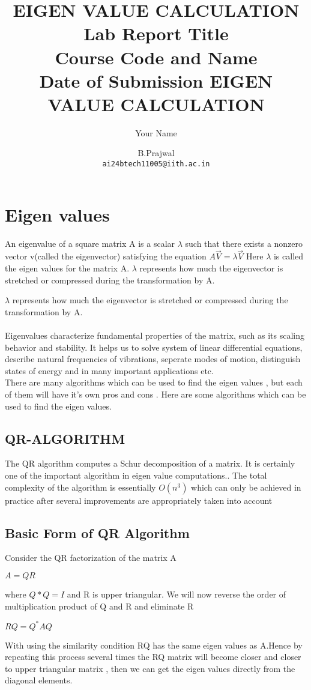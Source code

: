 \documentclass[a4paper,12pt]{article}
\title{ EIGEN VALUE CALCULATION
    \vspace{2cm} %
    \vspace{1cm} %
    \textbf{\Huge Lab Report Title} \\
    \vspace{1cm} %
    \large Course Code and Name \\
    \vspace{0.5cm} %
    \large Date of Submission
}
\author{Your Name}
\date{}
\title{EIGEN VALUE CALCULATION}
\author{%
  B.Prajwal\\%
  \texttt{ai24btech11005@iith.ac.in} \\
}
\begin{document}
\maketitle{}
\section{Eigen values}
An eigenvalue of a square matrix A is a scalar $\lambda$ such that there exists a nonzero vector v(called the eigenvector) satisfying the equation $A\overrightarrow{V}=\lambda \overrightarrow{V}$ Here ${\lambda}$ is called the eigen values for the matrix A. \textbf{$\lambda$} represents how much the eigenvector is stretched or compressed during the transformation by A.

$\lambda$ represents how much the eigenvector is stretched or compressed during the transformation by A.\\\\Eigenvalues characterize fundamental properties of the matrix, such as its scaling behavior and stability. It helps us to solve system of linear differential equations, describe natural frequencies of vibrations, seperate modes of motion, distinguish states of energy and in many important applications etc.\\
There are many algorithms which can be used to  find the eigen values , but each of them will have it's own pros and cons . Here are some algorithms which can be used to find the eigen values.


\subsection{QR-ALGORITHM}
The QR algorithm computes a Schur decomposition of a matrix. It is certainly one of the important algorithm in eigen value computations.. The total complexity of the algorithm is essentially $O(n^3)$ which can only be achieved in practice after several improvements are appropriately taken into account
\subsection{Basic Form of QR Algorithm}
Consider the QR factorization of the matrix A\\
                \begin{center}
                   $A=QR$ 
                \end{center}   
 where $Q*Q = I$ and R is upper triangular. We will now reverse the order of multiplication product of Q and R and eliminate R     
 \begin{center}
     $RQ=Q^{*}AQ$
 \end{center}
 With using the similarity condition RQ has the same eigen values as A.Hence by repeating this process several times the RQ matrix will become closer and closer to upper triangular matrix , then we can get the eigen values directly from the diagonal elements.
 
\end{document}
